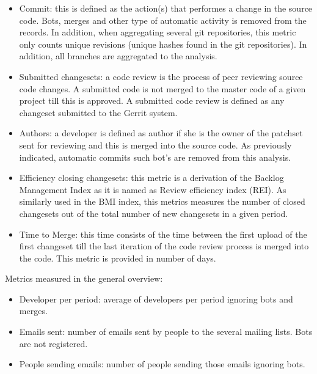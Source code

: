 \documentclass[a4wide,11pt]{article}
\begin{document}
\begin{itemize}
\item Commit: this is defined as the action(s) that performes a change in the source code. 
Bots, merges and other type of automatic activity is removed from the records. In addition,
when aggregating several git repositories, this metric only counts unique revisions (unique hashes found in the git repositories).
In addition, all branches are aggregated to the analysis.

\item Submitted changesets: a code review is the process of peer reviewing source code changes. A submitted code
is not merged to the master code of a given project till this is approved.
A submitted code review is defined as any changeset submitted to the Gerrit
system. 
 
\item Authors: a developer is defined as author if she is the owner of the patchset sent for reviewing and this is 
merged into the source code. As previously indicated, automatic commits such bot's are removed from this analysis.

\item Efficiency closing changesets: this metric is a derivation of the Backlog Management Index as it is named as
Review efficiency index (REI). As similarly used in the BMI index, this metrics measures the number of closed changesets
 out of the total number of new changesets in a given period.

\item Time to Merge: this time consists of the time between the first upload of the first changeset
till the last iteration of the code review process is merged into the code.
This metric is provided in number of days.


\end{itemize}


Metrics measured in the general overview:

\begin{itemize}
\item Developer per period: average of developers per period ignoring bots and merges.

\item Emails sent: number of emails sent by people to the several mailing lists. Bots are not registered.

\item People sending emails: number of people sending those emails ignoring bots.

\end{itemize}
\end{document}
